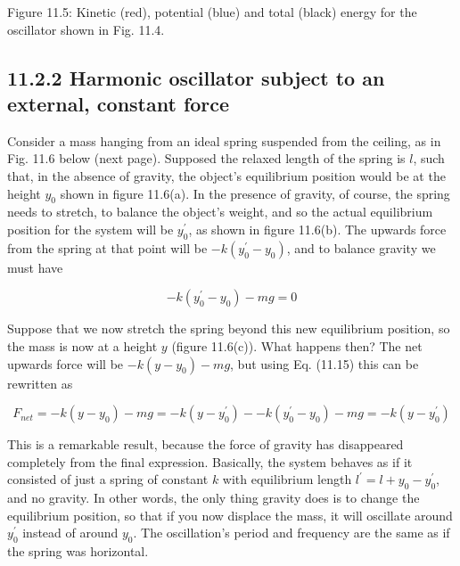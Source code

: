 \documentclass[10pt]{article}
\begin{document}
Figure 11.5: Kinetic (red), potential (blue) and total (black) energy for the oscillator shown in Fig. 11.4.

\subsection*{11.2.2 Harmonic oscillator subject to an external, constant force}
Consider a mass hanging from an ideal spring suspended from the ceiling, as in Fig. 11.6 below (next page). Supposed the relaxed length of the spring is $l$, such that, in the absence of gravity, the object's equilibrium position would be at the height $y_{0}$ shown in figure 11.6(a). In the presence of gravity, of course, the spring needs to stretch, to balance the object's weight, and so the actual equilibrium position for the system will be $y_{0}^{\prime}$, as shown in figure 11.6(b). The upwards force from the spring at that point will be $-k\left(y_{0}^{\prime}-y_{0}\right)$, and to balance gravity we must have


\begin{equation*}
-k\left(y_{0}^{\prime}-y_{0}\right)-m g=0 \tag{11.15}
\end{equation*}


Suppose that we now stretch the spring beyond this new equilibrium position, so the mass is now at a height $y$ (figure 11.6(c)). What happens then? The net upwards force will be $-k\left(y-y_{0}\right)-m g$, but using Eq. (11.15) this can be rewritten as


\begin{equation*}
F_{n e t}=-k\left(y-y_{0}\right)-m g=-k\left(y-y_{0}^{\prime}\right)--k\left(y_{0}^{\prime}-y_{0}\right)-m g=-k\left(y-y_{0}^{\prime}\right) \tag{11.16}
\end{equation*}


This is a remarkable result, because the force of gravity has disappeared completely from the final expression. Basically, the system behaves as if it consisted of just a spring of constant $k$ with equilibrium length $l^{\prime}=l+y_{0}-y_{0}^{\prime}$, and no gravity. In other words, the only thing gravity does is to change the equilibrium position, so that if you now displace the mass, it will oscillate around $y_{0}^{\prime}$ instead of around $y_{0}$. The oscillation's period and frequency are the same as if the spring was horizontal.
\end{document}
